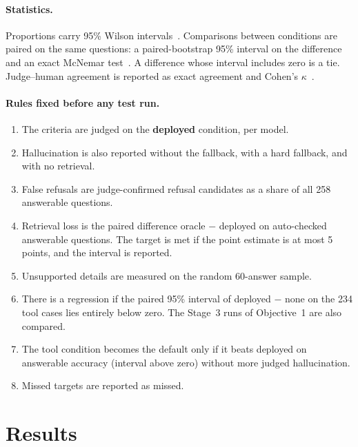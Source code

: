 \documentclass[11pt,a4paper]{article}
\begin{document}
\paragraph{Statistics.} Proportions carry 95\% Wilson intervals~\cite{wilson}. Comparisons between conditions are paired
on the same questions: a paired-bootstrap 95\% interval on the difference~\cite{efron} and an exact McNemar
test~\cite{mcnemar}. A difference whose interval includes zero is a tie. Judge--human agreement is reported as exact
agreement and Cohen's $\kappa$~\cite{kappa}.

\paragraph{Rules fixed before any test run.}
\begin{enumerate}
  \item The criteria are judged on the \textbf{deployed} condition, per model.
  \item Hallucination is also reported without the fallback, with a hard fallback, and with no retrieval.
  \item False refusals are judge-confirmed refusal candidates as a share of all 258 answerable questions.
  \item Retrieval loss is the paired difference oracle $-$ deployed on auto-checked answerable questions. The target is
        met if the point estimate is at most 5 points, and the interval is reported.
  \item Unsupported details are measured on the random 60-answer sample.
  \item There is a regression if the paired 95\% interval of deployed $-$ none on the 234 tool cases lies entirely below
        zero. The Stage~3 runs of Objective~1 are also compared.
  \item The tool condition becomes the default only if it beats deployed on answerable accuracy (interval above zero)
        without more judged hallucination.
  \item Missed targets are reported as missed.
\end{enumerate}

\section{Results}\label{sec:results}
\end{document}

